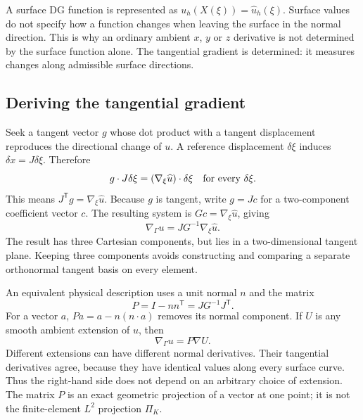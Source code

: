 A surface DG function is represented as
$u_h(X(\xi))=\widehat u_h(\xi)$. Surface values do not specify how a function
changes when leaving the surface in the normal direction. This is why an
ordinary ambient $x$, $y$ or $z$ derivative is not determined by the surface
function alone. The tangential gradient is determined: it measures changes
along admissible surface directions.

\subsection{Deriving the tangential gradient}
Seek a tangent vector $g$ whose dot product with a tangent displacement
reproduces the directional change of $u$. A reference displacement
$\delta\xi$ induces $\delta x=J\delta\xi$. Therefore
\begin{equation}
 g\cdot J\delta\xi=(\nabla_\xi\widehat u)\cdot\delta\xi
 \quad\hbox{for every }\delta\xi.
\end{equation}
This means $J^{\mathsf T}g=\nabla_\xi\widehat u$. Because $g$ is tangent,
write $g=Jc$ for a two-component coefficient vector $c$. The resulting
system is $Gc=\nabla_\xi\widehat u$, giving
\begin{equation}
 \boxed{\nabla_\Gamma u=J G^{-1}\nabla_\xi\widehat u.}
 \label{eq:app-surface-gradient}
\end{equation}
The result has three Cartesian components, but lies in a two-dimensional
tangent plane. Keeping three components avoids constructing and comparing
a separate orthonormal tangent basis on every element.

An equivalent physical description uses a unit normal $n$ and the matrix
\begin{equation}
 P=I-nn^{\mathsf T}=J G^{-1}J^{\mathsf T}.
\end{equation}
For a vector $a$, $Pa=a-n(n\cdot a)$ removes its normal component. If
$U$ is any smooth ambient extension of $u$, then
\begin{equation}
 \nabla_\Gamma u=P\nabla U.
 \label{eq:app-tangent-projection}
\end{equation}
Different extensions can have different normal derivatives. Their tangential
derivatives agree, because they have identical values along every surface
curve. Thus the right-hand side does not depend on an arbitrary choice of
extension. The matrix $P$ is an exact geometric projection of a vector at
one point; it is not the finite-element $L^2$ projection $\Pi_K$.

